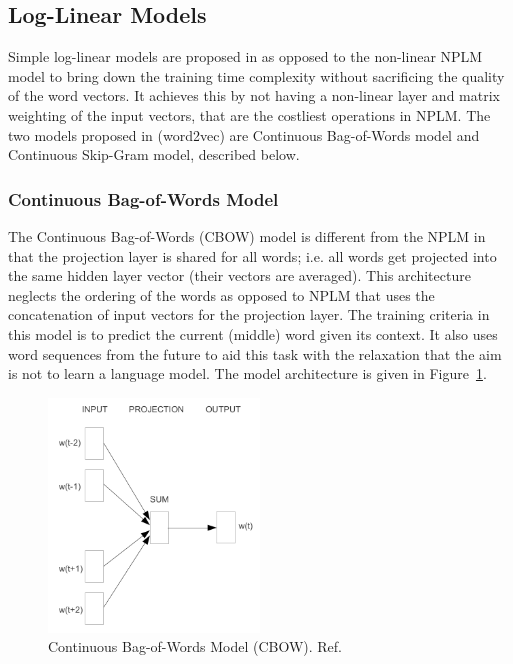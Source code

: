 \subsection{Log-Linear Models}
\label{sec:word2vec}
Simple log-linear models are proposed in \citet{mikolov2013efficient} as opposed to the non-linear NPLM model to bring down the training time complexity without sacrificing the quality of the word vectors. It achieves this by not having a non-linear layer and matrix weighting of the input vectors, that are the costliest operations in NPLM. The two models proposed in \citet{mikolov2013efficient} (word2vec) are Continuous Bag-of-Words model and Continuous Skip-Gram model, described below.

\subsubsection{Continuous Bag-of-Words Model}
\label{sec:cbow}
The Continuous Bag-of-Words (CBOW) model is different from the NPLM in that the projection layer is shared for all words; i.e. all words get projected into the same hidden layer vector (their vectors are averaged). This architecture neglects the ordering of the words as opposed to NPLM that uses the concatenation of input vectors for the projection layer. The training criteria in this model is to predict the current (middle) word given its context. It also uses word sequences from the future to aid this task with the relaxation that the aim is not to learn a language model. The model architecture is given in Figure~\ref{fig:nn:cbow}.
\begin{figure}[h!]
    \centering
        \includegraphics[width=0.5\textwidth]{figs/mikolov_cbow.png}
    \caption{Continuous Bag-of-Words Model (CBOW). Ref. \cite{mikolov2013efficient} }
    \label{fig:nn:cbow}
\end{figure}
